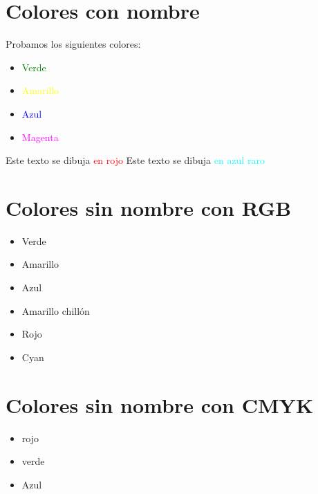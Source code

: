 \documentclass[10pt,a4paper]{article}
\author{Jose Antonio Pérez Martín}
\begin{document}
\section{Colores con nombre}
Probamos los siguientes colores:
\begin{itemize}
\item \textcolor{green}{Verde}
\item \textcolor{yellow}{Amarillo}
\item \textcolor{blue}{Azul}
\item \textcolor{magenta}{Magenta}
\end{itemize}
Este texto se dibuja \textcolor{red}{en rojo}
Este texto se dibuja \textcolor{cyan}{en azul raro}
\section{Colores sin nombre con RGB}
\begin{itemize}
\item \textcolor[rgb]{0,1,0}{Verde}
\item \textcolor[rgb]{1,1,0}{Amarillo}
\item \textcolor[rgb]{0,0,1}{Azul}
\item \textcolor[rgb]{0.7,0.7,0}{Amarillo chillón}
\item \textcolor[rgb]{1,0,0}{Rojo}
\item \textcolor[rgb]{0,0.5,1}{Cyan}
\end{itemize}
\section{Colores sin nombre con CMYK}
\begin{itemize}
	\item \textcolor[cmyk]{0,1,1,0}{rojo}
	\item \textcolor[cmyk]{1,0,1,0}{verde}
	\item \textcolor[cmyk]{1,1,0,0}{Azul}
\end{itemize}
\end{document}
